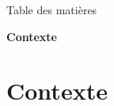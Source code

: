 




    {
        \begin{specialframe}
            \vspace{2cm}\hspace*{-1.8cm}\parbox[t]{\textwidth}{\titlepage}
        \end{specialframe}
    }
    \begin{specialframe}{Table des matières}
        \tableofcontents[hideallsubsections]
    \end{specialframe}

  \setcounter{framenumber}{0}
    {
        \begin{specialframe}
            \vspace{2cm}\hspace*{-1.8cm}\parbox[t]{\textwidth}{
                \begin{center}
                    \begin{Huge}
                            \textcolor{pheniics_purple}{\textbf{Contexte}}
                    \end{Huge}
                \end{center}
            }
        \end{specialframe}
    }

  \section{Contexte}
    
